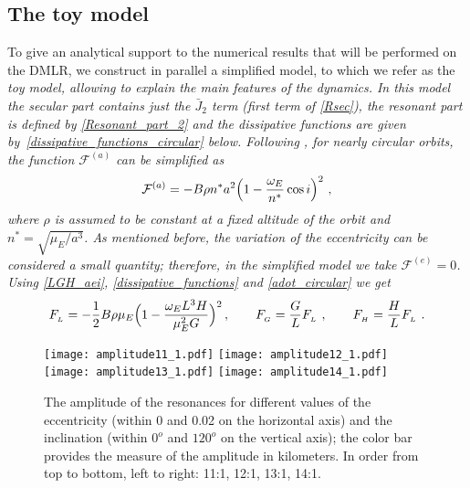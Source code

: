 \documentclass[12pt,reqno]{amsart}
\numberwithin{equation}{section}
\begin{document}
\subsection{The toy model}\label{sec:toy}

To give an analytical support to the numerical results that will
be performed on the DMLR, we construct in parallel a
simplified model, to which we refer as the \sl toy model, \rm
allowing to explain the main features of the dynamics. In this
model the secular part contains just the $\bar{J}_2$ term (first
term of \eqref{Rsec}), the resonant part is defined by
\eqref{Resonant_part_2} and the dissipative functions are given
by~\eqref{dissipative_functions_circular} below. Following
\cite{Chao}, for nearly circular orbits, the function
$\mathcal{F}^{(a)}$ can be simplified as
\begin{equation}\label{adot_circular}
\mathcal{F}^{(a)}=-B \rho n^* a^2 \Bigl(1-\frac{\omega_E}{n^*} \cos i\Bigr)^2\ ,
\end{equation}
where $\rho$ is assumed to be constant at a fixed altitude of the orbit and
$n^*=\sqrt{\mu_E/a^3}$. As mentioned before, the variation of the
eccentricity can be considered a small quantity; therefore,
in the simplified model we take $\mathcal{F}^{(e)}=0$.
Using \eqref{LGH_aei}, \eqref{dissipative_functions} and \eqref{adot_circular} we get
\begin{equation}\label{dissipative_functions_circular}
\begin{split}
F_{_L}=-\frac{1}{2} B \rho \mu_E\Bigl(1-\frac{\omega_E L^3 H}{\mu_E^2 G} \Bigr)^2\,,\qquad
F_{_G}=\frac{G}{L} F_{_L}\ ,\qquad F_{_H}=\frac{H}{L} F_{_L}\ .
\end{split}
\end{equation}


\begin{figure}[h]
\centering
{}
\texttt{[image: amplitude11\_1.pdf]}
\texttt{[image: amplitude12\_1.pdf]}\\
\vglue-0.6cm
\texttt{[image: amplitude13\_1.pdf]}
\texttt{[image: amplitude14\_1.pdf]}
\caption{The amplitude of the resonances for different values of the eccentricity (within 0 and 0.02 on the
horizontal axis)
and the inclination (within $0^o$ and $120^o$ on the vertical axis); the color bar provides the measure of the amplitude in kilometers.
In order from top to bottom, left to right: 11:1, 12:1, 13:1, 14:1.} \label{fig:amplitude}
\end{figure}
\end{document}
